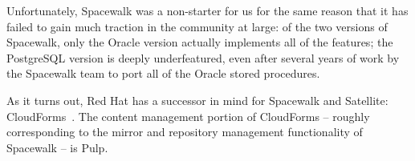 Unfortunately, Spacewalk was a non-starter for us for the same reason
that it has failed to gain much traction in the community at large: of
the two versions of Spacewalk, only the Oracle version actually
implements all of the features; the PostgreSQL version is deeply
underfeatured, even after several years of work by the Spacewalk team
to port all of the Oracle stored procedures.

As it turns out, Red Hat has a successor in mind for Spacewalk and
Satellite: CloudForms~\cite{WS11}.  The content management portion
of CloudForms -- roughly corresponding to the mirror and repository
management functionality of Spacewalk -- is Pulp.
